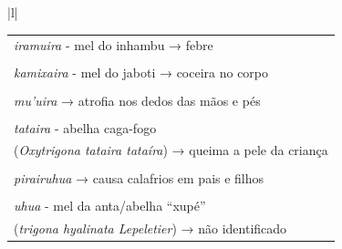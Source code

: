 






\begin{table}[!ht]
\centering
\label{my-label}
\begin{tabular}{|l|}
\hline
{}                                                                                                                                                                                                                                                                                        \\ \hline
\begin{tabular}[c]{@{}l@{}}\emph{iramuira} - mel do inhambu → febre\\ \\ \emph{kamixaira} - mel do jaboti → coceira no corpo\\ \\ \emph{mu'uira} → atrofia nos dedos das mãos e pés\\ \\ \emph{tataira} - abelha caga-fogo\\ (\emph{Oxytrigona tataira tataíra}) → queima a pele da criança\\ \\ \emph{pirairuhua} → causa calafrios em pais e filhos\\ \\ \emph{uhua} - mel da anta/abelha ``xupé'' \\ (\emph{trigona hyalinata Lepeletier}) → não identificado\end{tabular} \\ \hline
\end{tabular}
\end{table}

